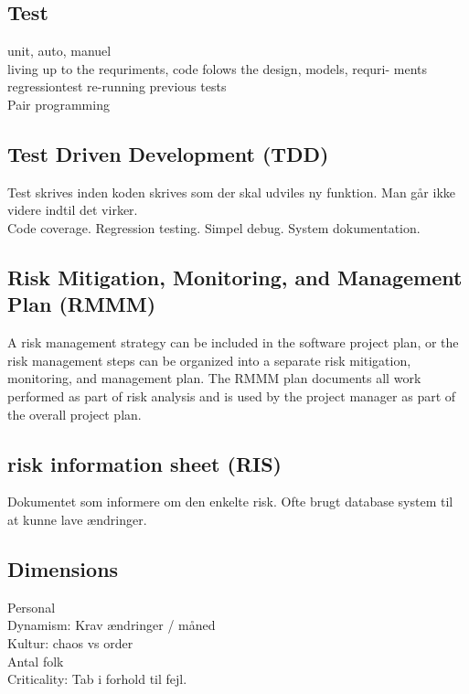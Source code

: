 \documentclass[11pt,a4paper]{article}
\begin{document}
\subsection{Test}
unit, auto, manuel\\
living up to the requriments, code folows the design, models, requri-
ments\\
regressiontest re-running previous tests\\
Pair programming
\subsection{Test Driven Development (TDD)}
Test skrives inden koden skrives som der skal udviles ny funktion. Man går ikke videre indtil det virker.\\
Code coverage. Regression testing. Simpel debug. System dokumentation.
\subsection{Risk Mitigation, Monitoring, and Management Plan (RMMM)}
A risk management strategy can be included in the software project plan, or the risk management steps can be organized into a separate
risk mitigation, monitoring, and management plan. The RMMM plan documents all work performed as part of risk analysis and is used by the project manager as part of the overall project plan.
\subsection{risk information sheet (RIS)}
Dokumentet som informere om den enkelte risk. 
Ofte brugt database system til at kunne lave ændringer.
\subsection{Dimensions}
Personal\\
Dynamism: Krav ændringer / måned\\
Kultur: chaos vs order\\
Antal folk\\
Criticality: Tab i forhold til fejl.
\end{document}
